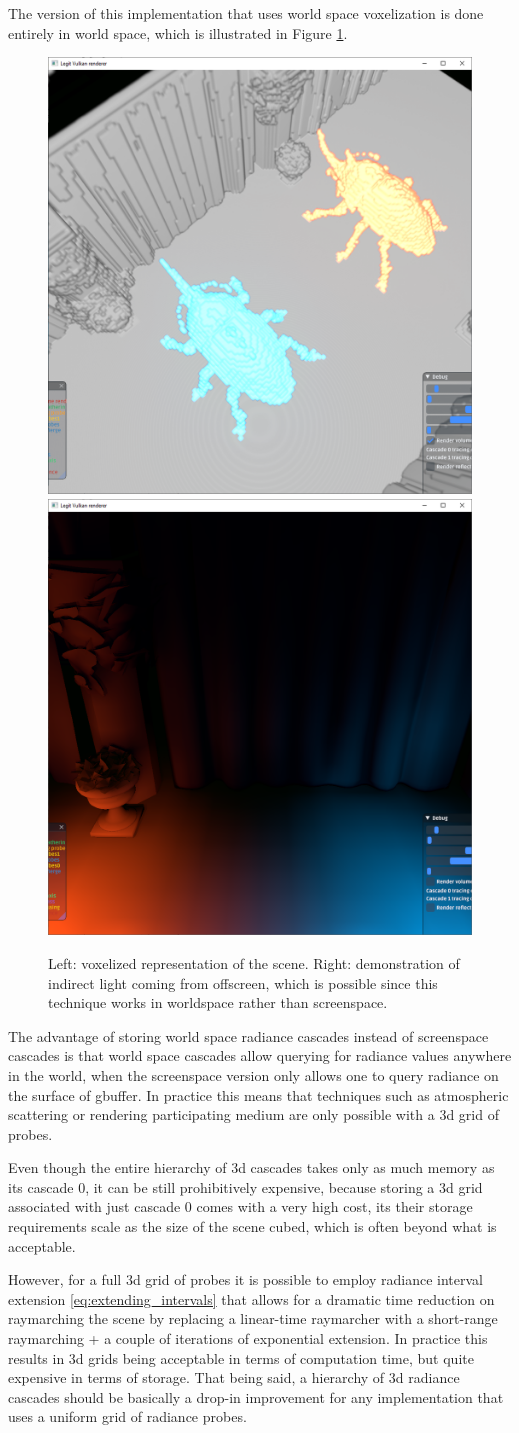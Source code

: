 \documentclass{jcgt}
\begin{document}
The version of this implementation that uses world space voxelization is done entirely in world space, which is illustrated in Figure \ref{fig:radiance_3d_offscreen}.
\begin{figure}[htb]
  \centering
  \includegraphics[width=0.3\columnwidth]{images/radiance_3d_voxels.png}
  \includegraphics[width=0.3\columnwidth]{images/radiance_3d_from_offscreen.png}
  \caption{\label{fig:radiance_3d_offscreen}
     Left: voxelized representation of the scene. Right: demonstration of indirect light coming from offscreen, which is possible since this technique works in worldspace rather than screenspace.}
\end{figure}

The advantage of storing world space radiance cascades instead of screenspace cascades is that world space cascades allow querying for radiance values anywhere in the world, when the screenspace version only allows one to query radiance on the surface of gbuffer. In practice this means that techniques such as atmospheric scattering or rendering participating medium are only possible with a 3d grid of probes.

Even though the entire hierarchy of 3d cascades takes only as much memory as its cascade 0, it can be still prohibitively expensive, because storing a 3d grid associated with just cascade 0 comes with a very high cost, its their storage requirements scale as the size of the scene cubed, which is often beyond what is acceptable.

However, for a full 3d grid of probes it is possible to employ radiance interval extension \ref{eq:extending_intervals} that allows for a dramatic time reduction on raymarching the scene by replacing a linear-time raymarcher with a short-range raymarching + a couple of iterations of exponential extension. In practice this results in 3d grids being acceptable in terms of computation time, but quite expensive in terms of storage. That being said, a hierarchy of 3d radiance cascades should be basically a drop-in improvement for any implementation that uses a uniform grid of radiance probes.
\end{document}
